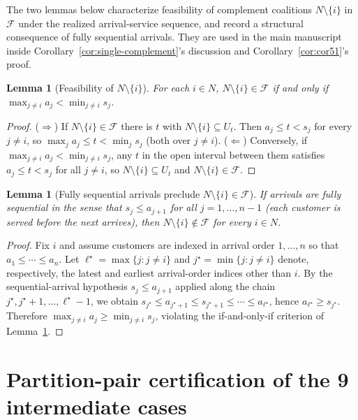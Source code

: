 \documentclass[11pt]{article}
\newcommand{\F}{\mathcal{F}}
\theoremstyle{plain}
\newtheorem{lemma}[theorem]{Lemma}
\theoremstyle{definition}
\theoremstyle{remark}
\begin{document}
The two lemmas below characterize feasibility of complement coalitions
$N\setminus\{i\}$ in $\F$ under the realized arrival-service sequence, and
record a structural consequence of fully sequential arrivals. They are
used in the main manuscript inside Corollary~\ref{cor:single-complement}'s
discussion and Corollary~\ref{cor:cor51}'s proof.

\begin{lemma}[Feasibility of $N\setminus\{i\}$]
\label{lem:lemma51}
For each $i\in N$, $N\setminus\{i\}\in\F$ if and only if $\max_{j\neq i} a_j < \min_{j\neq i} s_j$.
\end{lemma}

\begin{proof}
($\Rightarrow$) If $N\setminus\{i\}\in\F$ there is $t$ with $N\setminus\{i\}\subseteq U_t$. Then $a_j\le t < s_j$ for every $j\neq i$, so $\max_j a_j \le t < \min_j s_j$ (both over $j\neq i$). ($\Leftarrow$) Conversely, if $\max_{j\neq i} a_j < \min_{j\neq i} s_j$, any $t$ in the open interval between them satisfies $a_j\le t<s_j$ for all $j\neq i$, so $N\setminus\{i\}\subseteq U_t$ and $N\setminus\{i\}\in\F$.
\end{proof}

\begin{lemma}[Fully sequential arrivals preclude $N\setminus\{i\}\in\F$]
\label{lem:lemma52}
If arrivals are fully sequential in the sense that $s_j \le a_{j+1}$ for all $j=1,\ldots,n-1$ (each customer is served before the next arrives), then $N\setminus\{i\}\notin\F$ for every $i\in N$.
\end{lemma}

\begin{proof}
Fix $i$ and assume customers are indexed in arrival order $1,\ldots,n$ so that $a_1 \le \cdots \le a_n$. Let $\ell^{\star}=\max\{j:j\neq i\}$ and $j^{\star}=\min\{j:j\neq i\}$ denote, respectively, the latest and earliest arrival-order indices other than $i$. By the sequential-arrival hypothesis $s_j \le a_{j+1}$ applied along the chain $j^{\star}, j^{\star}+1, \ldots, \ell^{\star}-1$, we obtain $s_{j^{\star}} \le a_{j^{\star}+1} \le s_{j^{\star}+1} \le \cdots \le a_{\ell^{\star}}$, hence $a_{\ell^{\star}} \ge s_{j^{\star}}$. Therefore $\max_{j\neq i} a_j \ge \min_{j\neq i} s_j$, violating the if-and-only-if criterion of Lemma~\ref{lem:lemma51}.
\end{proof}

\section{Partition-pair certification of the 9 intermediate cases}
\label{app:partition-pair-cases}
\end{document}
